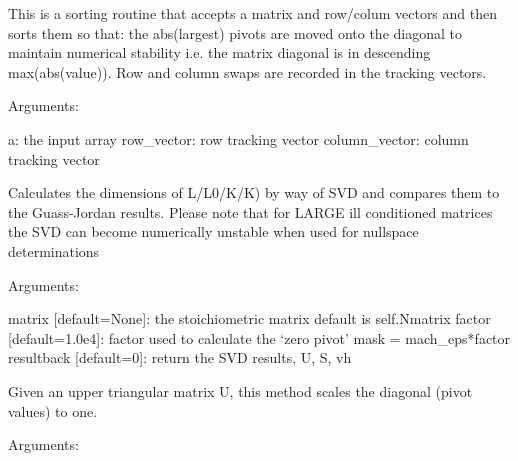 \documentclass[a4paper,11pt,english]{sphinxmanual}
\begin{document}
\begin{fulllineitems}
\begin{fulllineitems}
\end{fulllineitems}


\begin{fulllineitems}
\label{modules_doc:cbmpy.PyscesStoich.Stoich.PivotSort_initial}
This is a sorting routine that accepts a matrix and row/colum vectors
and then sorts them so that: the abs(largest) pivots are moved onto the diagonal to maintain
numerical stability i.e. the matrix diagonal is in descending max(abs(value)).
Row and column swaps are recorded in the tracking vectors.

Arguments:

a: the input array
row\_vector: row tracking vector
column\_vector: column tracking vector

\end{fulllineitems}


\begin{fulllineitems}
\label{modules_doc:cbmpy.PyscesStoich.Stoich.SVD_Rank_Check}
Calculates the dimensions of L/L0/K/K) by way of SVD and compares them to the Guass-Jordan results. Please note that for LARGE ill conditioned matrices the SVD can become numerically unstable when used for nullspace determinations

Arguments:

matrix {[}default=None{]}: the stoichiometric matrix default is self.Nmatrix
factor {[}default=1.0e4{]}: factor used to calculate the `zero pivot' mask = mach\_eps*factor
resultback {[}default=0{]}: return the SVD results, U, S, vh

\end{fulllineitems}


\begin{fulllineitems}
\label{modules_doc:cbmpy.PyscesStoich.Stoich.ScalePivots}
Given an upper triangular matrix U, this method scales the diagonal (pivot values) to one.

Arguments:


\end{fulllineitems}
\end{fulllineitems}
\end{document}
